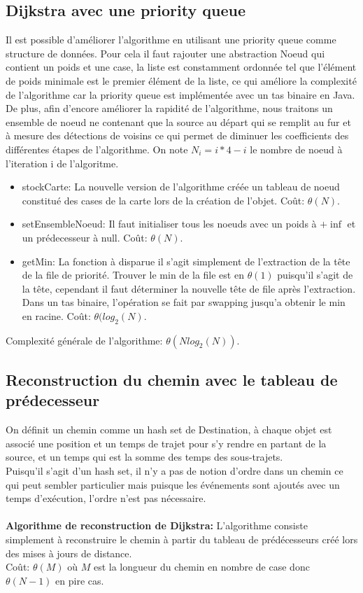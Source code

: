 \documentclass[12pt,a4paper]{article}
\begin{document}
\subsection{Dijkstra avec une priority queue}
Il est possible d'améliorer l'algorithme en utilisant une priority queue comme structure de données. Pour cela il faut rajouter une abstraction Noeud qui contient un poids et une case, la liste est constamment ordonnée tel que l'élément de poids minimale est le premier élément de la liste, ce qui améliore la complexité de l'algorithme car la priority queue est implémentée avec un tas binaire en Java.\\
De plus, afin d'encore améliorer la rapidité de l'algorithme, nous traitons un ensemble de noeud ne contenant que la source au départ qui se remplit au fur et à mesure des détections de voisins ce qui permet de diminuer les coefficients des différentes étapes de l'algorithme. On note $N_i=i*4-i$ le nombre de noeud à l'iteration i de l'algoritme.
\begin{itemize}
	\item stockCarte: La nouvelle version de l'algorithme créée un tableau de noeud constitué des cases de la carte lors de la création de l'objet. Coût: $\theta(N)$.
	\item setEnsembleNoeud: Il faut initialiser tous les noeuds avec un poids à $+\inf$ et un prédecesseur à null. Coût: $\theta(N)$.
	\item getMin: La fonction à disparue il s'agit simplement de l'extraction de la tête de la file de priorité. Trouver le min de la file est en $\theta(1)$ puisqu'il s'agit de la tête, cependant il faut déterminer la nouvelle tête de file après l'extraction. Dans un tas binaire, l'opération se fait par swapping jusqu'a obtenir le min en racine. Coût: $\theta(log_2(N)$.
\end{itemize}
Complexité générale de l'algorithme: $\theta(Nlog_2(N))$.\\

\subsection{Reconstruction du chemin avec le tableau de prédecesseur}

On définit un chemin comme un hash set de Destination, à chaque objet est associé une position et un temps de trajet pour s'y rendre en partant de la source, et un temps qui est la somme des temps des sous-trajets.\\
Puisqu'il s'agit d'un hash set, il n'y a pas de notion d'ordre dans un chemin ce qui peut sembler particulier mais puisque les événements sont ajoutés avec un temps d'exécution, l'ordre n'est pas nécessaire.\\\\
\textbf{Algorithme de reconstruction de Dijkstra:} L'algorithme consiste simplement à reconstruire le chemin à partir du tableau de prédécesseurs créé lors des mises à jours de distance.\\
Coût: $\theta(M)$ où $M$ est la longueur du chemin en nombre de case donc $\theta(N-1)$ en pire cas.
\end{document}
